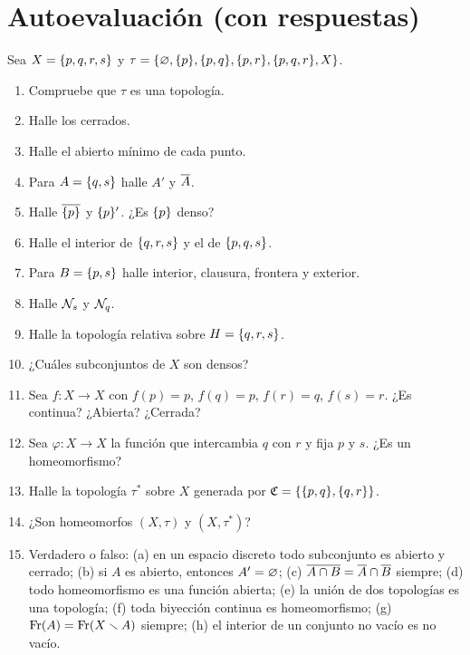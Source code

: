 \section{Autoevaluación (con respuestas)}\label{sec:auto}
Sea $X=\{p,q,r,s\}$ y $\tau=\{\varnothing,\{p\},\{p,q\},\{p,r\},\{p,q,r\},X\}$.
\begin{enumerate}[leftmargin=1.8em,itemsep=0.25em]
\item Compruebe que $\tau$ es una topología.
\item Halle los cerrados.
\item Halle el abierto mínimo de cada punto.
\item Para $A=\{q,s\}$ halle $A'$ y $\overline{A}$.
\item Halle $\overline{\{p\}}$ y $\{p\}'$. ¿Es $\{p\}$ denso?
\item Halle el interior de $\{q,r,s\}$ y el de $\{p,q,s\}$.
\item Para $B=\{p,s\}$ halle interior, clausura, frontera y exterior.
\item Halle $\mathcal{N}_s$ y $\mathcal{N}_q$.
\item Halle la topología relativa sobre $H=\{q,r,s\}$.
\item ¿Cuáles subconjuntos de $X$ son densos?
\item Sea $f:X\to X$ con $f(p)=p$, $f(q)=p$, $f(r)=q$, $f(s)=r$. ¿Es continua? ¿Abierta? ¿Cerrada?
\item Sea $\varphi:X\to X$ la función que intercambia $q$ con $r$ y fija $p$ y $s$. ¿Es un homeomorfismo?
\item Halle la topología $\tau^{\ast}$ sobre $X$ generada por $\mathfrak{C}=\{\{p,q\},\{q,r\}\}$.
\item ¿Son homeomorfos $(X,\tau)$ y $(X,\tau^{\ast})$?
\item Verdadero o falso: (a) en un espacio discreto todo subconjunto es abierto y cerrado; (b) si $A$ es abierto,
entonces $A'=\varnothing$; (c) $\overline{A\cap B}=\overline{A}\cap\overline{B}$ siempre; (d) todo homeomorfismo es una función abierta; (e) la
unión de dos topologías es una topología; (f) toda biyección continua es homeomorfismo; (g) $\operatorname{Fr}(A)=\operatorname{Fr}(X\smallsetminus A)$
siempre; (h) el interior de un conjunto no vacío es no vacío.
\end{enumerate}

